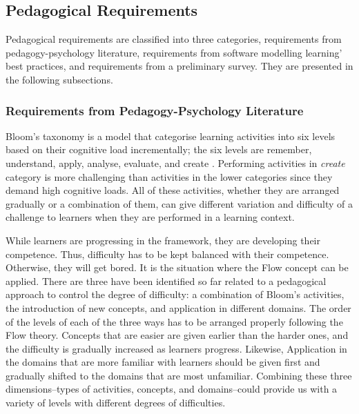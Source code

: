 \documentclass[12pt, a4paper]{report} \usepackage[titletoc]{appendix}
\begin{document}
\subsection{Pedagogical Requirements}
\label{Pedagogical Requirements}
Pedagogical requirements are classified into three categories, requirements from pedagogy-psychology literature, requirements from software modelling learning' best practices, and requirements from a preliminary survey. They are presented in the following subsections.  

\subsubsection{Requirements from Pedagogy-Psychology Literature}
\label{Requirements from Pedagogy-Psychology Literature}
Bloom's taxonomy is a model that categorise learning activities into six levels based on their cognitive load incrementally; the six levels are remember, understand, apply, analyse, evaluate, and create \cite{krathwohl2002revision}. Performing activities in \emph{create} category is more challenging than activities in the lower categories since they demand high cognitive loads. All of these activities, whether they are arranged gradually or a combination of them, can give different variation and difficulty of a challenge to learners when they are performed in a learning context. 

While learners are progressing in the framework, they are developing their competence. Thus, difficulty has to be kept balanced with their competence. Otherwise, they will get bored. It is the situation where the Flow concept \cite{csikszentmihalyi2014toward} can be applied. There are three have been identified so far related to a pedagogical approach to control the degree of difficulty: a combination of Bloom's activities, the introduction of new concepts, and application in different domains. The order of the levels of each of the three ways has to be arranged properly following the Flow theory. Concepts that are easier are given earlier than the harder ones, and the difficulty is gradually increased as learners progress. Likewise, Application in the domains that are more familiar with learners should be given first and gradually shifted to the domains that are most unfamiliar. Combining these three dimensions--types of activities, concepts, and domains--could provide us with a variety of levels with different degrees of difficulties. 
\end{document}
